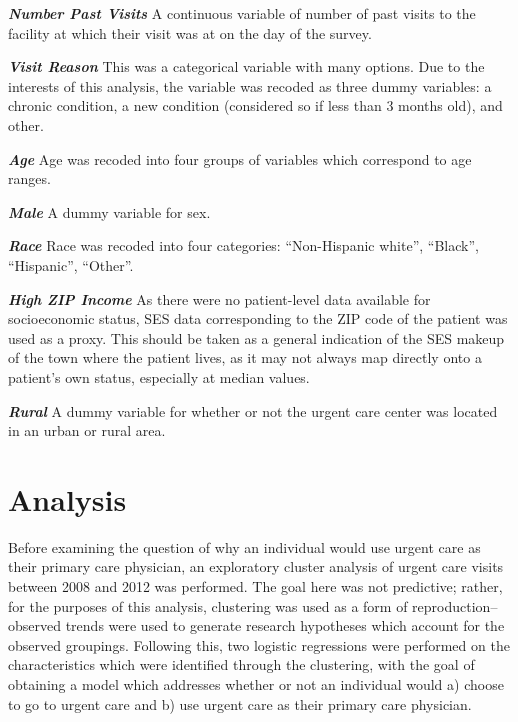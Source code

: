 \documentclass[12pt,twoside]{reedthesis}
\begin{document}
  \textbf{\emph{Number Past Visits}} A continuous variable of number of
  past visits to the facility at which their visit was at on the day of
  the survey.
  
  \textbf{\emph{Visit Reason}} This was a categorical variable with many
  options. Due to the interests of this analysis, the variable was recoded
  as three dummy variables: a chronic condition, a new condition
  (considered so if less than 3 months old), and other.
  
  \textbf{\emph{Age}} Age was recoded into four groups of variables which
  correspond to age ranges.
  
  \textbf{\emph{Male}} A dummy variable for sex.
  
  \textbf{\emph{Race}} Race was recoded into four categories:
  ``Non-Hispanic white'', ``Black'', ``Hispanic'', ``Other''.
  
  \textbf{\emph{High ZIP Income}} As there were no patient-level data
  available for socioeconomic status, SES data corresponding to the ZIP
  code of the patient was used as a proxy. This should be taken as a
  general indication of the SES makeup of the town where the patient
  lives, as it may not always map directly onto a patient's own status,
  especially at median values.
  
  \textbf{\emph{Rural}} A dummy variable for whether or not the urgent
  care center was located in an urban or rural area.
  
  \chapter*{Analysis}\label{analysis}
  
  \doublespacing
  
  Before examining the question of why an individual would use urgent care
  as their primary care physician, an exploratory cluster analysis of
  urgent care visits between 2008 and 2012 was performed. The goal here
  was not predictive; rather, for the purposes of this analysis,
  clustering was used as a form of reproduction--observed trends were used
  to generate research hypotheses which account for the observed
  groupings. Following this, two logistic regressions were performed on
  the characteristics which were identified through the clustering, with
  the goal of obtaining a model which addresses whether or not an
  individual would a) choose to go to urgent care and b) use urgent care
  as their primary care physician.
  
\end{document}

